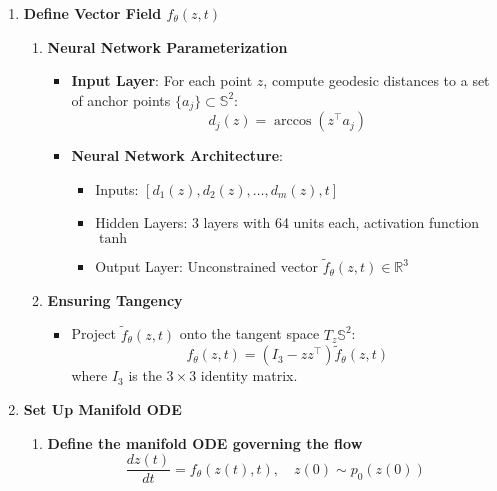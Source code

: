 \documentclass[a4paper,14pt]{article}
\theoremstyle{plain} %
\theoremstyle{definition} %
\theoremstyle{remark} %
\begin{document}
\begin{enumerate}
		\item \textbf{Define Vector Field \( f_\theta(z, t) \)}
		\begin{enumerate}
			\item \textbf{Neural Network Parameterization}
			\begin{itemize}
				\item \textbf{Input Layer}: For each point \( z \), compute geodesic distances to a set of anchor points \( \{ a_j \} \subset \mathbb{S}^2 \):
				\[
				d_j(z) = \arccos(z^\top a_j)
				\]
				\item \textbf{Neural Network Architecture}:
				\begin{itemize}
					\item Inputs: \( [d_1(z), d_2(z), \dots, d_m(z), t] \)
					\item Hidden Layers: 3 layers with 64 units each, activation function \( \tanh \)
					\item Output Layer: Unconstrained vector \( \tilde{f}_\theta(z, t) \in \mathbb{R}^3 \)
				\end{itemize}
			\end{itemize}
			\item \textbf{Ensuring Tangency}
			\begin{itemize}
				\item Project \( \tilde{f}_\theta(z, t) \) onto the tangent space \( T_z \mathbb{S}^2 \):
				\[
				f_\theta(z, t) = \left( I_3 - z z^\top \right) \tilde{f}_\theta(z, t)
				\]
				where \( I_3 \) is the \( 3 \times 3 \) identity matrix.
			\end{itemize}
		\end{enumerate}
		
		\item \textbf{Set Up Manifold ODE}
		
		\begin{enumerate}
			\item \textbf{Define the manifold ODE governing the flow}
			\[
			\frac{dz(t)}{dt} = f_\theta(z(t), t), \quad z(0) \sim p_0(z(0))
			\]
			

\end{enumerate}
\end{enumerate}
\end{document}
